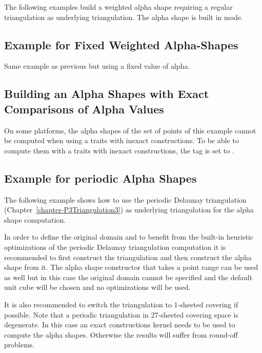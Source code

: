 The following examples build a weighted alpha shape requiring a
regular triangulation as underlying triangulation.
The alpha shape is built in  mode.



\subsection{Example for Fixed Weighted Alpha-Shapes\label{I1_SectFxWeightedAS3D}}

Same example as previous but using a fixed value of alpha.


\subsection{Building an Alpha Shapes with Exact Comparisons of Alpha Values}

On some platforms, the alpha shapes of the set of points of this example
cannot be computed when using a traits with inexact constructions. To be able to compute
them with a traits with inexact constructions, the tag
 is set to .

\subsection{Example for periodic
  Alpha Shapes\label{l1_SectPeriodicAS3D}}

The following example shows how to use the periodic Delaunay
triangulation (Chapter~\ref{chapter-P3Triangulation3}) as underlying
triangulation for the alpha shape computation.

In order to define the original domain and to benefit from the
built-in heuristic optimizations of the periodic Delaunay
triangulation computation it is recommended to first construct the
triangulation and then construct the alpha shape from it. The alpha
shape constructor that takes a point range can be used as well but in
this case the original domain cannot be specified and the default unit
cube will be chosen and no optimizations will be used.

It is also recommended to switch the triangulation to 1-sheeted
covering if possible. Note that a periodic triangulation in 27-sheeted
covering space is degenerate. In this case an exact constructions
kernel needs to be used to compute the alpha shapes. Otherwise the
results will suffer from round-off problems.



